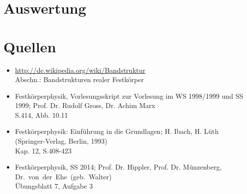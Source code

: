 \documentclass[numbers=noenddot,14pt,a4paper]{scrartcl}
\begin{document}
\section{Auswertung}
\section{Quellen}
\begin{itemize}
	\item{\url{http://de.wikipedia.org/wiki/Bandstruktur}\\ Abschn.: Bandstrukturen realer Festkörper}
	\item{Festkörperphysik, Vorlesungsskript zur Vorlesung im WS 1998/1999 und SS 1999; Prof. Dr. Rudolf Gross, Dr. Achim Marx\\
		S.414, Abb. 10.11}
	\item{Festkörperphysik: Einführung in die Grundlagen; H. Ibach, H. Lüth\\
	(Springer-Verlag, Berlin, 1993)\\
		Kap. 12, S.408-423}
	\item{Festkörperphysik, SS 2014; Prof. Dr. Hippler, Prof. Dr. Münzenberg,\\ \mbox{Dr. von der Ehe (geb. Walter)}\\
		Übungsblatt 7, Aufgabe 3}
\end{itemize}
\end{document}
